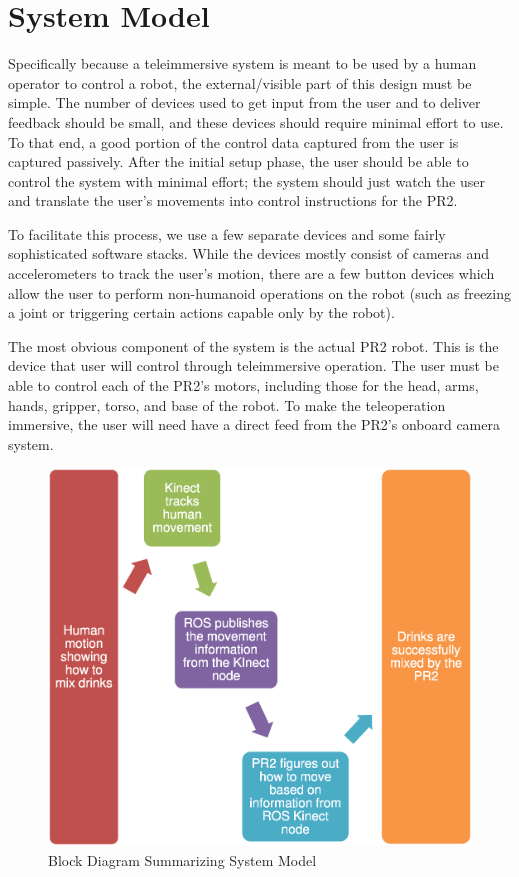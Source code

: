 \documentclass{sig-alternate}
\begin{document}
\section{System Model}
\label{sec:system_model}
Specifically because a teleimmersive system is meant to be used by a human 
operator to control a robot, the external/visible part of this
design must be simple. The number of devices used to get input from the user 
and to deliver feedback should be small, and these devices should require
minimal effort to use. To that
end, a good portion of the control data captured from the user is captured
passively. After the initial setup phase, the user should be able to control
the system with minimal effort; the system should just watch the user and
translate the user's movements into control instructions for the PR2.

To facilitate this process, we use a few separate devices and some
fairly sophisticated software stacks. While the
devices mostly consist of cameras and accelerometers to track the user's 
motion, there are a few button devices which allow the user to
perform non-humanoid operations on the robot (such as freezing a joint or
triggering certain actions capable only by the robot).

The most obvious component of the system is the actual PR2 robot. This is the
device that user will control through teleimmersive operation. The user must
be able to control each of the PR2's motors, including those for the head,
arms, hands, gripper, torso, and base of the robot. To make the teleoperation
immersive, the user will need have a direct feed from the PR2's onboard
camera system.

\begin{figure}[htb] 
	\begin{center}
		\includegraphics[width=1.0\linewidth]{flowchart}
	\end{center}
	\caption{Block Diagram Summarizing System Model}
	\label{fig:some_graph}
\end{figure}
\end{document}
